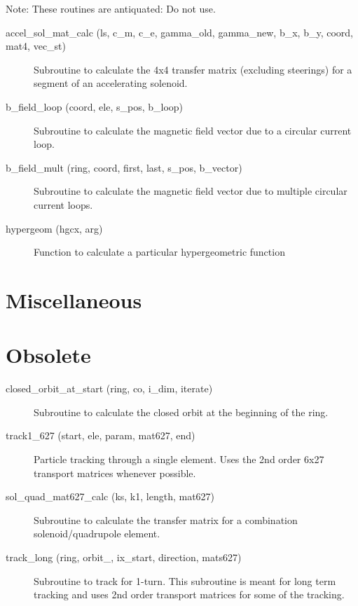 Note: These routines are antiquated: Do not use.

\begin{description}

\item[accel\_sol\_mat\_calc (ls, c\_m, c\_e, gamma\_old, gamma\_new, b\_x, b\_y, coord, mat4, vec\_st)] \Newline
Subroutine to calculate the 4x4 transfer matrix (excluding steerings) for a segment of an accelerating solenoid. 

\item[b\_field\_loop (coord, ele, s\_pos, b\_loop)] \Newline
Subroutine to calculate the magnetic field vector due to a circular current loop. 

\item[b\_field\_mult (ring, coord, first, last, s\_pos, b\_vector)] \Newline
Subroutine to calculate the magnetic field vector due to multiple circular current loops. 

\item[hypergeom (hgcx, arg)] \Newline
Function to calculate a particular hypergeometric function 

\end{description}

\section{Miscellaneous}
\label{r:misc}     

\begin{description}
\item
\end{description}

\section{Obsolete}
\label{r:obs}      

\begin{description}

\item[closed\_orbit\_at\_start (ring, co, i\_dim, iterate)] \Newline
Subroutine to calculate the closed orbit at the beginning of the ring. 

\item[track1\_627 (start, ele, param, mat627, end)] \Newline
Particle tracking through a single element. Uses the 2nd order 6x27 transport matrices whenever possible. 

\item[sol\_quad\_mat627\_calc (ks, k1, length, mat627)] \Newline
Subroutine to calculate the transfer matrix for a combination solenoid/quadrupole element. 

\item[track\_long (ring, orbit\_, ix\_start, direction, mats627)] \Newline
Subroutine to track for 1-turn. This subroutine is meant for long term tracking and uses 2nd order transport matrices for some of the tracking. 

\end{description}

